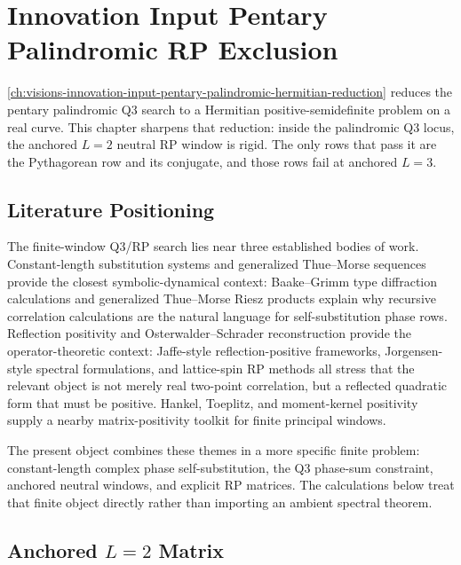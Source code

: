 \chapter{Innovation Input Pentary Palindromic RP Exclusion}
\label{ch:visions-innovation-input-pentary-palindromic-rp-exclusion}

\autoref{ch:visions-innovation-input-pentary-palindromic-hermitian-reduction}
reduces the pentary palindromic Q3 search to a Hermitian
positive-semidefinite problem on a real curve. This chapter sharpens that
reduction: inside the palindromic Q3 locus, the anchored $L=2$ neutral RP
window is rigid. The only rows that pass it are the Pythagorean row and
its conjugate, and those rows fail at anchored $L=3$.

\section{Literature Positioning}
\label{sec:innovation-input-palindromic-rp-literature-positioning}

\begin{principle}
\label{prin:innovation-input-adjacent-traditions}
The finite-window Q3/RP search lies near three established bodies of
work. Constant-length substitution systems and generalized
Thue--Morse sequences provide the closest symbolic-dynamical context:
Baake--Grimm type diffraction calculations and generalized
Thue--Morse Riesz products explain why recursive correlation calculations
are the natural language for self-substitution phase rows. Reflection
positivity and Osterwalder--Schrader reconstruction provide the
operator-theoretic context: Jaffe-style reflection-positive frameworks,
Jorgensen-style spectral formulations, and lattice-spin RP methods all
stress that the relevant object is not merely real two-point correlation,
but a reflected quadratic form that must be positive. Hankel, Toeplitz,
and moment-kernel positivity supply a nearby matrix-positivity toolkit for
finite principal windows.

The present object combines these themes in a more specific finite
problem: constant-length complex phase self-substitution, the Q3 phase-sum
constraint, anchored neutral windows, and explicit RP matrices. The
calculations below treat that finite object directly rather than importing
an ambient spectral theorem.
\end{principle}

\section{Anchored $L=2$ Matrix}
\label{sec:innovation-input-palindromic-ltwo-matrix}

